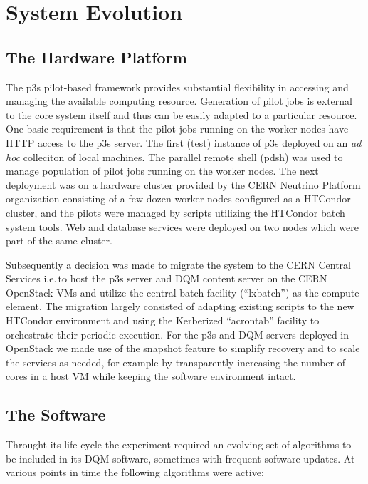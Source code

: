 \documentclass{webofc}
\begin{document}
\section{System Evolution}

\subsection{The Hardware Platform}
\label{sec:hardware}

The p3s pilot-based framework provides substantial flexibility in accessing and
managing the available computing resource. Generation of pilot jobs is external
to the core system itself and thus can be easily adapted to a particular resource.
One basic requirement is that the pilot jobs running on the worker nodes have
HTTP access to the p3s server. The first (test) instance of p3s deployed
on an \textit{ad hoc} colleciton of local machines. The parallel remote shell
(pdsh) was used to manage population of pilot jobs running on the worker nodes.
The next deployment was on a hardware cluster provided by the CERN
Neutrino Platform organization \cite{platform} consisting of a few dozen
worker nodes configured as a HTCondor cluster, and the pilots were managed
by scripts utilizing the HTCondor batch system tools. Web and database
services were deployed on two nodes which were part of the same cluster.

Subsequently a decision was made to migrate the system to the CERN Central
Services i.e.\,to host the p3s server and DQM content server on the CERN OpenStack
VMs and utilize  the central batch facility (``lxbatch'') as the compute element.
The migration largely consisted of adapting existing scripts to the new HTCondor
environment and using the Kerberized ``acrontab'' facility to orchestrate their
periodic execution. For the p3s and DQM servers deployed in OpenStack we made
use of the snapshot feature to simplify recovery and to scale the services as
needed, for example by transparently increasing the number of cores in a host
VM while keeping the software environment intact.

\subsection{The Software}
\label{sec:software}

Throught its life cycle the experiment required an evolving set of algorithms to
be included in its DQM software, sometimes with frequent software updates.
At various points in time the following algorithms were active:
\end{document}
